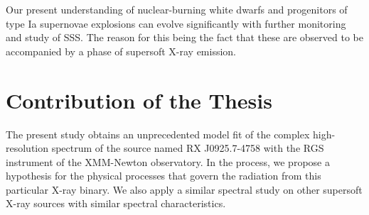         Our present understanding of nuclear-burning white dwarfs and progenitors of type Ia supernovae explosions can evolve significantly with further monitoring and study of SSS. The reason for this being the fact that these are observed to be accompanied by a phase of supersoft X-ray emission.
    
    \section{Contribution of the Thesis} \label{introduction:thesis_contribution}
        The present study obtains an unprecedented model fit of the complex high-resolution spectrum of the source named RX J0925.7-4758 with the RGS instrument of the XMM-Newton observatory. In the process, we propose a hypothesis for the physical processes that govern the radiation from this particular X-ray binary. We also apply a similar spectral study on other supersoft X-ray sources with similar spectral characteristics.
    
